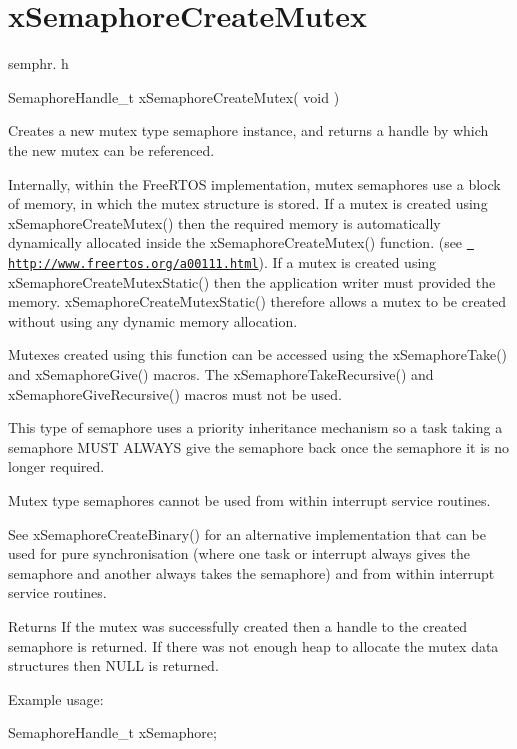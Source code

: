 \hypertarget{group__x_semaphore_create_mutex}{}\section{x\+Semaphore\+Create\+Mutex}
\label{group__x_semaphore_create_mutex}
semphr. h 
\begin{DoxyPre}SemaphoreHandle\_t xSemaphoreCreateMutex( void )\end{DoxyPre}


Creates a new mutex type semaphore instance, and returns a handle by which the new mutex can be referenced.

Internally, within the Free\+R\+T\+OS implementation, mutex semaphores use a block of memory, in which the mutex structure is stored. If a mutex is created using x\+Semaphore\+Create\+Mutex() then the required memory is automatically dynamically allocated inside the x\+Semaphore\+Create\+Mutex() function. (see \href{http://www.freertos.org/a00111.html}{\texttt{ http\+://www.\+freertos.\+org/a00111.\+html}}). If a mutex is created using x\+Semaphore\+Create\+Mutex\+Static() then the application writer must provided the memory. x\+Semaphore\+Create\+Mutex\+Static() therefore allows a mutex to be created without using any dynamic memory allocation.

Mutexes created using this function can be accessed using the x\+Semaphore\+Take() and x\+Semaphore\+Give() macros. The x\+Semaphore\+Take\+Recursive() and x\+Semaphore\+Give\+Recursive() macros must not be used.

This type of semaphore uses a priority inheritance mechanism so a task \textquotesingle{}taking\textquotesingle{} a semaphore M\+U\+ST A\+L\+W\+A\+YS \textquotesingle{}give\textquotesingle{} the semaphore back once the semaphore it is no longer required.

Mutex type semaphores cannot be used from within interrupt service routines.

See x\+Semaphore\+Create\+Binary() for an alternative implementation that can be used for pure synchronisation (where one task or interrupt always \textquotesingle{}gives\textquotesingle{} the semaphore and another always \textquotesingle{}takes\textquotesingle{} the semaphore) and from within interrupt service routines.

\begin{DoxyReturn}{Returns}
If the mutex was successfully created then a handle to the created semaphore is returned. If there was not enough heap to allocate the mutex data structures then N\+U\+LL is returned.
\end{DoxyReturn}
Example usage\+: 
\begin{DoxyPre}
SemaphoreHandle\_t xSemaphore;\end{DoxyPre}



